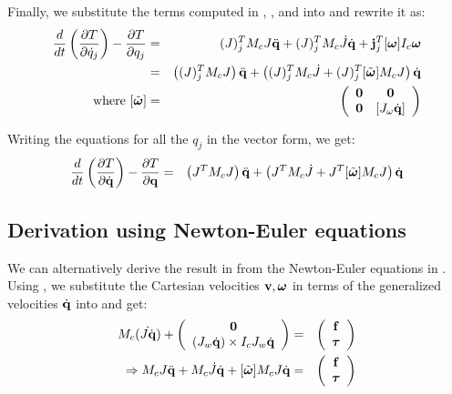 Finally, we substitute the terms computed in , ,  and  into  and rewrite it as:
\begin{eqnarray}
\label{eq:lageqn_j_final}
\nonumber
\frac{d}{dt} \left ( \frac{\partial T}{\partial \dot{q}_j} \right ) - \frac{\partial T}{\partial q_j} & = & (J)_j^T M_c J \ddot{\mathbf{q}} + (J)_j^T M_c \dot{J} \dot{\mathbf{q}} + \mathbf{j}_j^T[\bm{\omega}]I_c \bm{\omega}\\
\nonumber
& = & \left( (J)_j^T M_c J \right )\ddot{\mathbf{q}} + \left( (J)_j^T M_c \dot{J} + (J)_j^T [\tilde{\bm{\omega}}]M_c J \right )\dot{\mathbf{q}}\\
\mbox{where } [\tilde{\bm{\omega}}] & = &
\left ( 
\begin{array}{cc}
\mathbf{0} & \mathbf{0} \\
\mathbf{0} & [J_\omega \dot{\mathbf{q}}]
\end{array}
\right )
\end{eqnarray}

Writing the equations for all the $q_j$ in the vector form, we get:
\begin{eqnarray}
\label{eq:dyngen_vec}
\frac{d}{dt} \left ( \frac{\partial T}{\partial \dot{\mathbf{q}}} \right ) - \frac{\partial T}{\partial \mathbf{q}} & = & \left( J^T M_c J \right )\ddot{\mathbf{q}} + \left( J^T M_c \dot{J} + J^T [\tilde{\bm{\omega}}]M_c J \right )\dot{\mathbf{q}}
\end{eqnarray}


\subsection{Derivation using Newton-Euler equations}
We can alternatively derive the result in  from the Newton-Euler equations in . Using , we substitute the Cartesian velocities $\mathbf{v},\bm{\omega}$ in terms of the generalized velocities $\dot{\mathbf{q}}$ into  and get:
\begin{eqnarray}
\nonumber
M_c (\dot{J\dot{\mathbf{q}}}) + 
\left ( 
\begin{array}{c}
\mathbf{0} \\
(J_w \dot{\mathbf{q}}) \times I_c J_w \dot{\mathbf{q}}
\end{array}
\right )
& = &
\left ( 
\begin{array}{c}
\mathbf{f} \\
\bm{\tau}
\end{array}
\right )\\
\Rightarrow 
M_c J \ddot{\mathbf{q}} + M_c \dot{J} \dot{\mathbf{q}} + [\tilde{\bm{\omega}}]M_c J \dot{\mathbf{q}} & = & 
\left ( 
\begin{array}{c}
\mathbf{f} \\
\bm{\tau}
\end{array}
\right )
\end{eqnarray}

